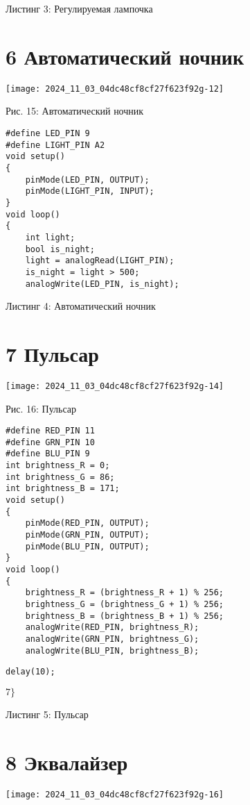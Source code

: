 \documentclass[10pt]{article}
\begin{document}
Листинг 3: Регулируемая лампочка

\section*{6 Автоматический ночник}
\begin{center}
\texttt{[image: 2024\_11\_03\_04dc48cf8cf27f623f92g-12]}
\end{center}

Рис. 15: Автоматический ночник

\begin{verbatim}
#define LED_PIN 9
#define LIGHT_PIN A2
void setup()
{
    pinMode(LED_PIN, OUTPUT);
    pinMode(LIGHT_PIN, INPUT);
}
void loop()
{
    int light;
    bool is_night;
    light = analogRead(LIGHT_PIN);
    is_night = light > 500;
    analogWrite(LED_PIN, is_night);
\end{verbatim}

Листинг 4: Автоматический ночник

\section*{7 Пульсар}
\begin{center}
\texttt{[image: 2024\_11\_03\_04dc48cf8cf27f623f92g-14]}
\end{center}

Рис. 16: Пульсар

\begin{verbatim}
#define RED_PIN 11
#define GRN_PIN 10
#define BLU_PIN 9
int brightness_R = 0;
int brightness_G = 86;
int brightness_B = 171;
void setup()
{
    pinMode(RED_PIN, OUTPUT);
    pinMode(GRN_PIN, OUTPUT);
    pinMode(BLU_PIN, OUTPUT);
}
void loop()
{
    brightness_R = (brightness_R + 1) % 256;
    brightness_G = (brightness_G + 1) % 256;
    brightness_B = (brightness_B + 1) % 256;
    analogWrite(RED_PIN, brightness_R);
    analogWrite(GRN_PIN, brightness_G);
    analogWrite(BLU_PIN, brightness_B);
\end{verbatim}

\begin{verbatim}
delay(10);
\end{verbatim}

$7\}$

Листинг 5: Пульсар

\section*{8 Эквалайзер}
\begin{center}
\texttt{[image: 2024\_11\_03\_04dc48cf8cf27f623f92g-16]}
\end{center}
\end{document}
